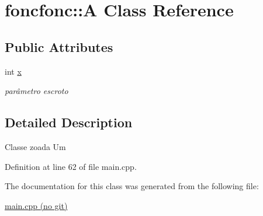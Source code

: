 \hypertarget{classfoncfonc_1_1A}{\section{foncfonc\-:\-:A Class Reference}
\label{classfoncfonc_1_1A}
}
\subsection*{Public Attributes}
\begin{DoxyCompactItemize}
\item 
\hypertarget{classfoncfonc_1_1A_a54959ea2ab58000251776e0d819878f2}{int \hyperlink{classfoncfonc_1_1A_a54959ea2ab58000251776e0d819878f2}{x}}\label{classfoncfonc_1_1A_a54959ea2ab58000251776e0d819878f2}

\begin{DoxyCompactList}\small\item\em parâmetro escroto \end{DoxyCompactList}\end{DoxyCompactItemize}


\subsection{Detailed Description}
Classe zoada Um 

Definition at line 62 of file main.\-cpp.



The documentation for this class was generated from the following file\-:\begin{DoxyCompactItemize}
\item 
\hyperlink{main_8cpp}{main.\-cpp (no git)}\end{DoxyCompactItemize}
